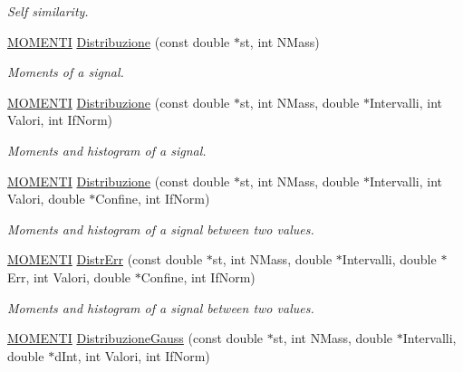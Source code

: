 \begin{DoxyCompactItemize}
\begin{DoxyCompactList}\small\item\em \-Self similarity. \end{DoxyCompactList}\item 
\hypertarget{classMatematica_a39b05b88f4b8ec478bd4da89c0e469d0}{\hyperlink{structMOMENTI}{\-M\-O\-M\-E\-N\-T\-I} \hyperlink{classMatematica_a39b05b88f4b8ec478bd4da89c0e469d0}{\-Distribuzione} (const double $\ast$st, int \-N\-Mass)}\label{classMatematica_a39b05b88f4b8ec478bd4da89c0e469d0}

\begin{DoxyCompactList}\small\item\em \-Moments of a signal. \end{DoxyCompactList}\item 
\hypertarget{classMatematica_a1ab633f13d7ee483931d6b17f9fb0164}{\hyperlink{structMOMENTI}{\-M\-O\-M\-E\-N\-T\-I} \hyperlink{classMatematica_a1ab633f13d7ee483931d6b17f9fb0164}{\-Distribuzione} (const double $\ast$st, int \-N\-Mass, double $\ast$\-Intervalli, int \-Valori, int \-If\-Norm)}\label{classMatematica_a1ab633f13d7ee483931d6b17f9fb0164}

\begin{DoxyCompactList}\small\item\em \-Moments and histogram of a signal. \end{DoxyCompactList}\item 
\hypertarget{classMatematica_a45b9e8e40b9d8107cbfdb92cec130ea3}{\hyperlink{structMOMENTI}{\-M\-O\-M\-E\-N\-T\-I} \hyperlink{classMatematica_a45b9e8e40b9d8107cbfdb92cec130ea3}{\-Distribuzione} (const double $\ast$st, int \-N\-Mass, double $\ast$\-Intervalli, int \-Valori, double $\ast$\-Confine, int \-If\-Norm)}\label{classMatematica_a45b9e8e40b9d8107cbfdb92cec130ea3}

\begin{DoxyCompactList}\small\item\em \-Moments and histogram of a signal between two values. \end{DoxyCompactList}\item 
\hypertarget{classMatematica_a5e8fb8fff251f8594af3f6ec809bdd46}{\hyperlink{structMOMENTI}{\-M\-O\-M\-E\-N\-T\-I} \hyperlink{classMatematica_a5e8fb8fff251f8594af3f6ec809bdd46}{\-Distr\-Err} (const double $\ast$st, int \-N\-Mass, double $\ast$\-Intervalli, double $\ast$\-Err, int \-Valori, double $\ast$\-Confine, int \-If\-Norm)}\label{classMatematica_a5e8fb8fff251f8594af3f6ec809bdd46}

\begin{DoxyCompactList}\small\item\em \-Moments and histogram of a signal between two values. \end{DoxyCompactList}\item 
\hypertarget{classMatematica_a558ecd17e8fec096693541f1d83545ae}{\hyperlink{structMOMENTI}{\-M\-O\-M\-E\-N\-T\-I} \hyperlink{classMatematica_a558ecd17e8fec096693541f1d83545ae}{\-Distribuzione\-Gauss} (const double $\ast$st, int \-N\-Mass, double $\ast$\-Intervalli, double $\ast$d\-Int, int \-Valori, int \-If\-Norm)}\label{classMatematica_a558ecd17e8fec096693541f1d83545ae}


\end{DoxyCompactItemize}
